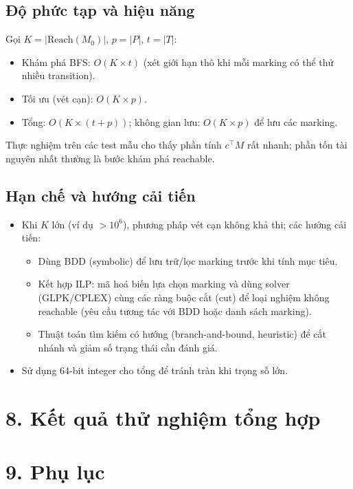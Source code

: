 \documentclass[12pt,a4paper]{article}
\begin{document}
\begin{itemize}
\end{itemize}

\subsection*{Độ phức tạp và hiệu năng}
Gọi $K=|\mathrm{Reach}(M_0)|$, $p=|P|$, $t=|T|$:
\begin{itemize}
    \item Khám phá BFS: $O(K\times t)$ (xét giới hạn thô khi mỗi marking có thể thử nhiều transition).
    \item Tối ưu (vét cạn): $O(K\times p)$.
    \item Tổng: $O(K\times (t+p))$; không gian lưu: $O(K\times p)$ để lưu các marking.
\end{itemize}
Thực nghiệm trên các test mẫu cho thấy phần tính $c^{\top}M$ rất nhanh; phần tốn tài nguyên nhất thường là bước khám phá reachable.

\subsection*{Hạn chế và hướng cải tiến}
\begin{itemize}
    \item Khi $K$ lớn (ví dụ $>10^6$), phương pháp vét cạn không khả thi; các hướng cải tiến:
        \begin{itemize}
            \item Dùng BDD (symbolic) để lưu trữ/lọc marking trước khi tính mục tiêu.
            \item Kết hợp ILP: mã hoá biến lựa chọn marking và dùng solver (GLPK/CPLEX) cùng các ràng buộc cắt (cut) để loại nghiệm không reachable (yêu cầu tương tác với BDD hoặc danh sách marking).
            \item Thuật toán tìm kiếm có hướng (branch-and-bound, heuristic) để cắt nhánh và giảm số trạng thái cần đánh giá.
        \end{itemize}
    \item Sử dụng 64-bit integer cho tổng để tránh tràn khi trọng số lớn.
\end{itemize}
\section*{8. Kết quả thử nghiệm tổng hợp}

\section*{9. Phụ lục}
\end{document}
